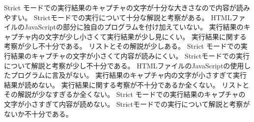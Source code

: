 {{  {Strict モードでの実行結果のキャプチャの文字が十分な大きさなので内容が読みやすい。}
  {Strictモードでの実行について十分な解説と考察がある。}
  }
	{
  {HTMLファイルのJavaScriptの部分に独自のプログラムを付け加えていない。}
  {実行結果のキャプチャ内の文字が少し小さくて実行結果が少し見にくい。}
  {実行結果に関する考察が少し不十分である。}
  {リストとその解説が少しある。}
  {Strict モードでの実行結果のキャプチャの文字が小さくて内容が読みにくい。}
  {Strictモードでの実行について解説と考察が少し不十分である。}
	}
	{
  {HTMLファイルのJavaScriptの使用したプログラムに言及がない。}
  {実行結果のキャプチャ内の文字が小さすぎて実行結果が読めない。}
  {実行結果に関する考察が不十分であるか全くない。}
  {リストとその解説が少なすぎるか全くない。}
  {Strict モードでの実行結果のキャプチャの文字が小さすぎて内容が読めない。}
  {Strictモードでの実行について解説と考察がないか不十分である。}
	}
}

